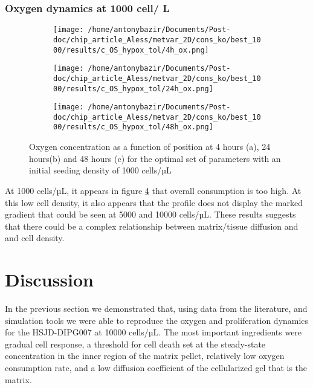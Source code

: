 \documentclass[11pt,a4paper]{article}
\begin{document}
\subsubsection{Oxygen dynamics at 1000 cell/ \textmu L}
\begin{figure}[ht!]
\begin{subfigure}{0.33\textwidth}
	\centering
	\texttt{[image: /home/antonybazir/Documents/Post-doc/chip\_article\_Aless/metvar\_2D/cons\_ko/best\_1000/results/c\_OS\_hypox\_tol/4h\_ox.png]}
	\caption{ \label{4h_ox_best_1000}}
\end{subfigure}
\begin{subfigure}{0.33\textwidth}
	\centering
	\texttt{[image: /home/antonybazir/Documents/Post-doc/chip\_article\_Aless/metvar\_2D/cons\_ko/best\_1000/results/c\_OS\_hypox\_tol/24h\_ox.png]}
	\caption{ \label{24h_ox_best_1000}}
\end{subfigure}
\begin{subfigure}{0.33\textwidth}
	\centering
	\texttt{[image: /home/antonybazir/Documents/Post-doc/chip\_article\_Aless/metvar\_2D/cons\_ko/best\_1000/results/c\_OS\_hypox\_tol/48h\_ox.png]}
	\caption{ \label{48h_ox_best_1000}}
\end{subfigure}
\caption{Oxygen concentration as a function of position at 4 hours (a), 24 hours(b) and 48 hours (c) for the optimal set of parameters with an initial seeding density of 1000 cells/µL \label{Ox_best_1000}}
\end{figure}

At 1000 cells/µL, it appears in figure \ref{Ox_best_1000} that overall consumption is too high. At this low cell density, it also appears that the profile does not display the marked gradient that could be seen at 5000 and 10000 cells/µL. These results suggests that there could be a complex relationship between matrix/tissue diffusion and and cell density.

\section{Discussion}
In the previous section we demonstrated that, using data from the literature, and simulation tools we were able to reproduce the oxygen and proliferation dynamics for the HSJD-DIPG007 at 10000 cells/µL. The most important ingredients were gradual cell response, a threshold for cell death set at the steady-state concentration in the inner region of the matrix pellet, relatively low oxygen consumption rate, and a low diffusion coefficient of the cellularized gel that is the matrix.
\end{document}

